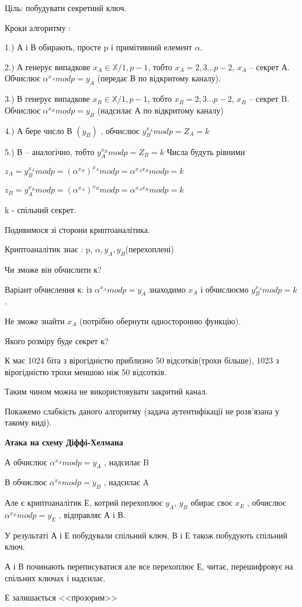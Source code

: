 Ціль: побудувати секретний ключ.

Кроки алгоритму : 

1.) А і В обирають, просте p і примітивний елемент $\alpha$.

2.) А генерує випадкове $x_A \in \mathbb X/ 1, p-1$, тобто $x_A = {2,3...p-2}$, $x_A$  – секрет А. Обчислює $\alpha ^{x_A} mod p = y_A$ (передає В по відкритому каналу).

3.) В генерує випадкове $x_B \in \mathbb X/ 1, p-1$, тобто $x_B = {2,3...p-2}$, $x_B$  – секрет B. Обчислює $\alpha ^{x_B} mod p  = y_B$ (надсилає А по відкритому каналу)

4.) А бере число В $(y_B)$ , обчислює $y_B^{x_A} mod p = Z_A = k$

5.)  В – аналогічно, тобто $ y_A^{x_B} mod p = Z_B = k$
Числа будуть рівними 


$z_A = y_B^{x_A} mod p = (\alpha ^{x_B})^{x_A} mod p = \alpha ^{x_Ax_B} mod p = k$


$z_B = y_A^{x_B} mod p = (\alpha ^{x_A})^{x_B} mod p = \alpha ^{x_Ax_B} mod p = k$

k - спільний секрет.

Подивимося зі сторони криптоаналітика.

Криптоаналітик знає : p, $\alpha, y_A, y_B$(перехоплені) 

Чи зможе він обчислити к?

Варіант обчислення к: із $\alpha ^{x_A} mod p = y_A $ знаходимо $x_A$ і обчислюємо $y_B^{x_A} mod p = k$.

Не зможе знайти $x_A$ (потрібно обернути односторонню функцію).

Якого розміру буде секрет к?

К має 1024 біта з вірогідністю приблизно 50 відсотків(трохи більше), 1023 з вірогідністю трохи меншою ніж 50 відсотків.

Таким чином можна не використовувати закритий канал.

Покажемо слабкість даного алгоритму (задача аутентифікації не розв’язана у такому виді).

\textbf{Атака на схему Діффі-Хелмана}

А обчислює $\alpha ^{x_A} mod p = y_A $ , надсилає B 

В обчислює $\alpha ^{x_B} mod p = y_B $ , надсилає A

Але є криптоаналітик Е, котрий перехоплює $y_A$, $y_B$ обирає своє $x_E$ , обчислює $\alpha ^{x_E} mod p = y_E $ , відправляє А і В.

У результаті А і Е побудували спільний ключ, В і Е також побудують спільний ключ. 

А і В починають переписуватися але все перехоплює Е, читає, перешифровує на спільних ключах і надсилає.

Е залишається <<прозорим>>
